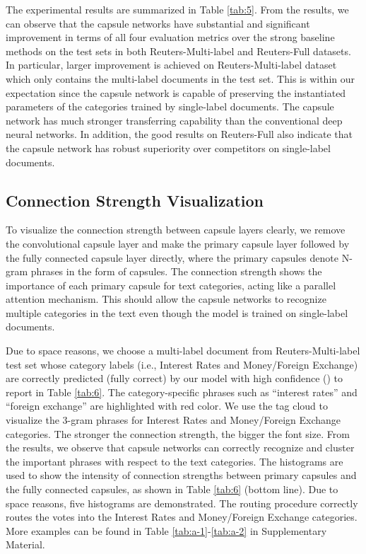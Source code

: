 \documentclass[11pt]{article}
\begin{document}
The experimental results are summarized in Table \ref{tab:5}. 
From the results, we can observe that the capsule networks 
have substantial and significant improvement in terms of all four evaluation metrics  over the strong baseline methods on the test sets in both Reuters-Multi-label and Reuters-Full datasets. In particular, larger improvement is achieved on Reuters-Multi-label dataset which only contains the multi-label documents in the test set. 
This is within our expectation since the capsule network is capable of preserving the instantiated parameters of the categories trained by single-label documents. The capsule network has much stronger transferring capability than the conventional deep neural networks. 
In addition, the good results on Reuters-Full also indicate that the capsule network has robust superiority over competitors on single-label documents.



\subsection{Connection Strength Visualization}
To visualize the connection strength between capsule layers clearly, we remove the convolutional capsule layer and make the primary capsule layer followed by the fully connected capsule layer directly, where the primary capsules denote N-gram phrases in the form of capsules. The connection strength shows the importance of each primary capsule for text  categories, acting like a parallel attention mechanism. This should allow the capsule networks to recognize multiple categories in the text even though the model is trained on single-label documents. 

Due to space reasons, we choose a multi-label document from Reuters-Multi-label test set whose category labels (i.e., Interest Rates and Money/Foreign Exchange) are correctly predicted (fully correct) by our model with high confidence () to report in Table \ref{tab:6}. 
The category-specific phrases such as ``interest rates'' and ``foreign exchange'' are highlighted with red color. We use the tag cloud to visualize the 3-gram phrases for 
Interest Rates and Money/Foreign Exchange categories. The stronger the connection strength, the bigger the font size.  From the results, we observe that capsule networks can correctly recognize and cluster the important phrases with respect to the text categories.
The histograms are used to show the intensity of connection strengths between primary capsules and the fully connected capsules, as shown in Table \ref{tab:6} (bottom line). Due to space reasons, five histograms are demonstrated.
The routing procedure correctly routes the votes into the Interest Rates and Money/Foreign Exchange categories. More examples can be found in Table \ref{tab:a-1}-\ref{tab:a-2} in Supplementary Material.
\end{document}
